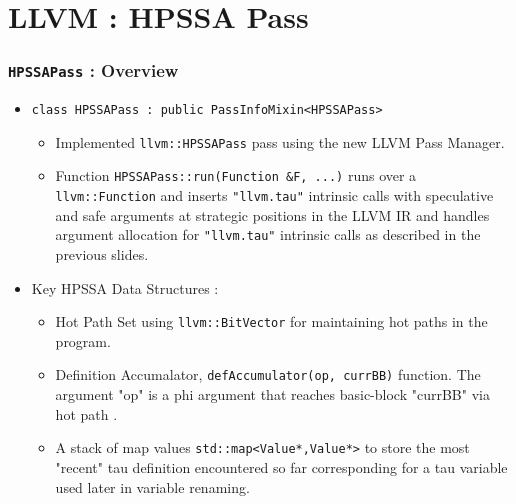 \documentclass{beamer}
\begin{document}
\section{LLVM : HPSSA Pass}
\footnotesize
\begin{frame}
	\frametitle{\texttt{HPSSAPass} : Overview}
	\begin{itemize}
		\item \texttt{class HPSSAPass : public PassInfoMixin<HPSSAPass>}
		\begin{itemize}
			\footnotesize
			\item Implemented \texttt{llvm::HPSSAPass} pass using the new LLVM Pass Manager. 
			\item Function \texttt{HPSSAPass::run(Function \&F, ...)}  runs over a \texttt{llvm::Function} and inserts \texttt{"llvm.tau"} intrinsic calls with speculative and safe arguments at strategic positions in the LLVM IR and handles argument allocation for  \texttt{"llvm.tau"} intrinsic calls as described in the previous slides.
		\end{itemize}
		\item Key HPSSA Data Structures :  
		\begin{itemize}
			\footnotesize
			\item Hot Path Set using \texttt{llvm::BitVector} for maintaining \color{red} hot paths \color{black} in the program.
			\item Definition Accumalator, \texttt{defAccumulator(op, currBB)} function. %
			The argument "op" is a phi argument that reaches basic-block "currBB" via \color{red} hot path \color{black}. 
			\item A stack of map values \texttt{std::map<Value*,Value*>} to store the most "recent" tau definition encountered so far corresponding for a tau variable used later in variable renaming. 
		\end{itemize}
	\end{itemize}
\end{frame}
\end{document}

